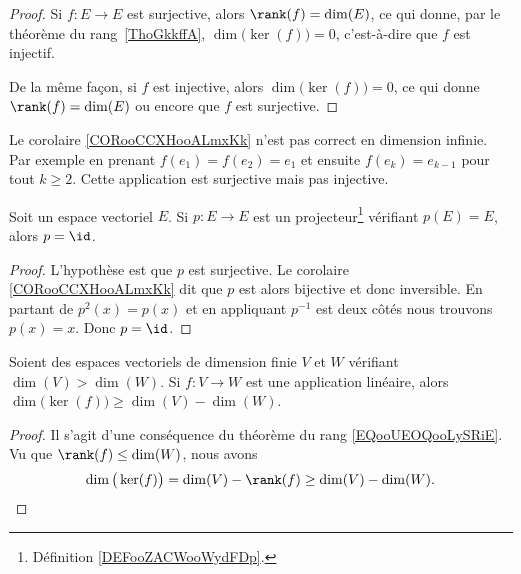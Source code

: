 \begin{proof}
	Si \( f\colon E\to E\) est surjective, alors \( \rank(f)=\dim(E)\), ce qui donne, par le théorème du rang~\ref{ThoGkkffA}, \( \dim\big( \ker(f) \big)=0\), c'est-à-dire que \( f\) est injectif.

	De la même façon, si \( f\) est injective, alors \( \dim\big( \ker(f) \big)=0\), ce qui donne \( \rank(f)=\dim(E)\) ou encore que \( f\) est surjective.
\end{proof}

\begin{example}
	Le corolaire \ref{CORooCCXHooALmxKk} n'est pas correct en dimension infinie. Par exemple en prenant \( f(e_1)=f(e_2)=e_1\) et ensuite \( f(e_k)=e_{k-1}\) pour tout \( k\geq 2\). Cette application est surjective mais pas injective.
\end{example}



\begin{lemma}	\label{LEMooNNDDooKXdqud}
	Soit un espace vectoriel \( E\). Si \(p \colon E\to E  \) est un projecteur\footnote{Définition \ref{DEFooZACWooWydFDp}.} vérifiant \( p(E)=E\), alors \( p=\id\).
\end{lemma}

\begin{proof}
	L'hypothèse est que \( p\) est surjective. Le corolaire \ref{CORooCCXHooALmxKk} dit que \( p\) est alors bijective et donc inversible. En partant de \( p^2(x)=p(x)\) et en appliquant \( p^{-1}\) est deux côtés nous trouvons \( p(x)=x\). Donc \( p=\id\).
\end{proof}

\begin{proposition}	\label{PROPooKUAVooCbjDcR}
	Soient des espaces vectoriels de dimension finie \( V\) et \( W\) vérifiant \( \dim(V)>\dim(W)\). Si \(f \colon V\to W  \) est une application linéaire, alors \( \dim\big( \ker(f) \big)\geq \dim(V)-\dim(W)\).
\end{proposition}

\begin{proof}
	Il s'agit d'une conséquence du théorème du rang \eqref{EQooUEOQooLySRiE}. Vu que \( \rank(f)\leq \dim(W)\), nous avons
	\begin{equation}
		\dim\big( \ker(f) \big)=\dim(V)-\rank(f)\geq \dim(V)-\dim(W).
	\end{equation}
\end{proof}


